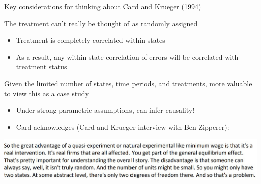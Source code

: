 \documentclass[notes,11pt, aspectratio=169]{beamer}
\newenvironment{wideitemize}{\itemize\addtolength{\itemsep}{10pt}}{\enditemize}
\begin{document}
\begin{frame}{Key considerations for thinking about Card and Krueger (1994)}
  \begin{wideitemize}
  \item The treatment can't really be thought of as randomly assigned
    \begin{itemize}
    \item Treatment is completely correlated within states
    \item As a result, any within-state correlation of errors will be
      correlated with treatment status
    \end{itemize}

  \item Given the limited number of states, time periods, and
    treatments, more valuable to view this as a case study
    \begin{itemize}
    \item Under strong parametric assumptions, can infer causality!
      \item Card acknowledges (Card and Krueger interview with Ben Zipperer):
    \end{itemize}
    \includegraphics[width=\linewidth]{images/card_interview.png}
  \end{wideitemize}
\end{frame}
\end{document}
